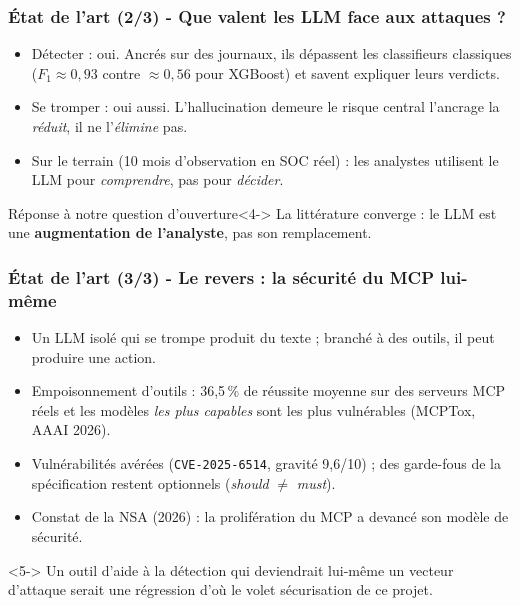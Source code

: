 \documentclass[aspectratio=169,11pt]{beamer}
\begin{document}
\begin{frame}
  \frametitle{État de l'art (2/3) - Que valent les LLM face aux attaques ?}
  \vspace{0.2cm}
  \begin{itemize}\setlength\itemsep{0.55em}
    \item Détecter : oui. Ancrés sur des journaux, ils dépassent les
      classifieurs classiques ($F_1 \approx 0{,}93$ contre $\approx 0{,}56$ pour
      XGBoost) et savent expliquer leurs verdicts.
    \item<2-> Se tromper : oui aussi. L'hallucination demeure le risque
      central l'ancrage la \emph{réduit}, il ne l'\emph{élimine} pas.
    \item<3-> Sur le terrain (10 mois d'observation en SOC réel) : les
      analystes utilisent le LLM pour \emph{comprendre}, pas pour \emph{décider}.
  \end{itemize}
  \vspace{0.3cm}
  \begin{exampleblock}{Réponse à notre question d'ouverture}<4->
    La littérature converge : le LLM est une \textbf{augmentation de
    l'analyste}, pas son remplacement.
  \end{exampleblock}
\end{frame}
 
\begin{frame}
  \frametitle{État de l'art (3/3) - Le revers : la sécurité du MCP lui-même}
  \vspace{0.05cm}
  \begin{itemize}\setlength\itemsep{0.4em}
    \item Un LLM isolé qui se trompe produit du texte ; branché à des
      outils, il peut produire une action.
    \item<2-> Empoisonnement d'outils : 36,5\,\% de réussite moyenne
      sur des serveurs MCP réels et les modèles \emph{les plus capables}
      sont les plus vulnérables (MCPTox, AAAI 2026).
    \item<3-> Vulnérabilités avérées (\texttt{CVE-2025-6514}, gravité 9,6/10) ;
      des garde-fous de la spécification restent optionnels
      (\emph{should} $\neq$ \emph{must}).
    \item<4-> Constat de la NSA (2026) : la prolifération du MCP a
      devancé son modèle de sécurité.
  \end{itemize}
  \vspace{0.1cm}
  \begin{block}{ }<5->
    Un outil d'aide à la détection qui deviendrait lui-même un vecteur
    d'attaque serait une régression d'où le volet sécurisation de
    ce projet.
  \end{block}
\end{frame}
 
\end{document}
